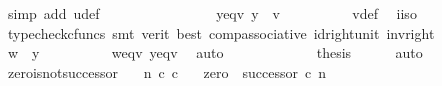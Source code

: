 \begin{isabellebody}
\ {\isacharparenleft}{\kern0pt}simp\ add{\isacharcolon}{\kern0pt}\ u{\isacharunderscore}{\kern0pt}def{\isacharparenright}{\kern0pt}\isanewline
\ \ \ \ \ \ \isamarkupfalse%
\isanewline
\ \ \ \ \ \ \isamarkupfalse%
\ \isamarkupfalse%
\ y{\isacharunderscore}{\kern0pt}eq{\isacharunderscore}{\kern0pt}v{\isacharcolon}{\kern0pt}\ {\isachardoublequoteopen}y\ {\isacharequal}{\kern0pt}\ v{\isachardoublequoteclose}\isanewline
\ \ \ \ \ \ \ \ \isamarkupfalse%
\ v{\isacharunderscore}{\kern0pt}def\ \isamarkupfalse%
\ i{\isacharunderscore}{\kern0pt}iso\isanewline
\ \ \ \ \ \ \ \ \isamarkupfalse%
\ {\isacharparenleft}{\kern0pt}typecheck{\isacharunderscore}{\kern0pt}cfuncs{\isacharcomma}{\kern0pt}\ smt\ {\isacharparenleft}{\kern0pt}verit{\isacharcomma}{\kern0pt}\ best{\isacharparenright}{\kern0pt}\ comp{\isacharunderscore}{\kern0pt}associative{}\ id{\isacharunderscore}{\kern0pt}right{\isacharunderscore}{\kern0pt}unit{}\ inv{\isacharunderscore}{\kern0pt}right{\isacharparenright}{\kern0pt}\isanewline
\ \ \ \ \ \ \isamarkupfalse%
\ {\isachardoublequoteopen}w\ {\isacharequal}{\kern0pt}\ y{\isachardoublequoteclose}\isanewline
\ \ \ \ \ \ \ \ \isamarkupfalse%
\ w{\isacharunderscore}{\kern0pt}eq{\isacharunderscore}{\kern0pt}v\ y{\isacharunderscore}{\kern0pt}eq{\isacharunderscore}{\kern0pt}v\ \isamarkupfalse%
\ auto\isanewline
\ \ \ \ \isamarkupfalse%
\isanewline
\ \ \isamarkupfalse%
\isanewline
\ \ \isamarkupfalse%
\ \isamarkupfalse%
\ {\isacharquery}{\kern0pt}thesis\isanewline
\ \ \ \ \isamarkupfalse%
\ auto\isanewline
{}\isamarkupfalse%
%
\endisatagproof
{\isafoldproof}%
%
\isadelimproof
%
\endisadelimproof
%
\isadelimdocument
%
\endisadelimdocument
%
\isatagdocument
%
\isamarkuptrue%
%
\endisatagdocument
{\isafolddocument}%
%
\isadelimdocument
%
\endisadelimdocument
{}\isamarkupfalse%
\ zero{\isacharunderscore}{\kern0pt}is{\isacharunderscore}{\kern0pt}not{\isacharunderscore}{\kern0pt}successor{\isacharcolon}{\kern0pt}\isanewline
\ \ \ {\isachardoublequoteopen}n\ {\isasymin}\isactrlsub c\ {\isasymnat}\isactrlsub c{\isachardoublequoteclose}\isanewline
\ \ \ {\isachardoublequoteopen}zero\ {\isasymnoteq}\ successor\ {\isasymcirc}\isactrlsub c\ n{\isachardoublequoteclose}\isanewline
%
\isadelimproof
%
\endisadelimproof

\end{isabellebody}
